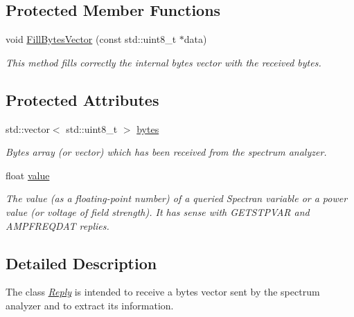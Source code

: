 \subsection*{Protected Member Functions}
\begin{DoxyCompactItemize}
\item 
void \hyperlink{classReply_a8a6a68aeda60bfda6615272d2905a1ac}{Fill\+Bytes\+Vector} (const std\+::uint8\+\_\+t $\ast$data)
\begin{DoxyCompactList}\small\item\em This method fills correctly the internal bytes vector with the received bytes. \end{DoxyCompactList}\end{DoxyCompactItemize}
\subsection*{Protected Attributes}
\begin{DoxyCompactItemize}
\item 
\mbox{\label{classReply_af9a348b823fc5ef09b470ba2cf2f625a}} 
std\+::vector$<$ std\+::uint8\+\_\+t $>$ \hyperlink{classReply_af9a348b823fc5ef09b470ba2cf2f625a}{bytes}
\begin{DoxyCompactList}\small\item\em Bytes array (or vector) which has been received from the spectrum analyzer. \end{DoxyCompactList}\item 
\mbox{\label{classReply_ae6d1cce2fdfa549568ad0ec9f5c6f13c}} 
float \hyperlink{classReply_ae6d1cce2fdfa549568ad0ec9f5c6f13c}{value}
\begin{DoxyCompactList}\small\item\em The value (as a floating-\/point number) of a queried Spectran variable or a power value (or voltage of field strength). It has sense with {\itshape G\+E\+T\+S\+T\+P\+V\+AR} and {\itshape A\+M\+P\+F\+R\+E\+Q\+D\+AT} replies. \end{DoxyCompactList}\end{DoxyCompactItemize}


\subsection{Detailed Description}
The class {\itshape \hyperlink{classReply}{Reply}} is intended to receive a bytes vector sent by the spectrum analyzer and to extract its information. 


